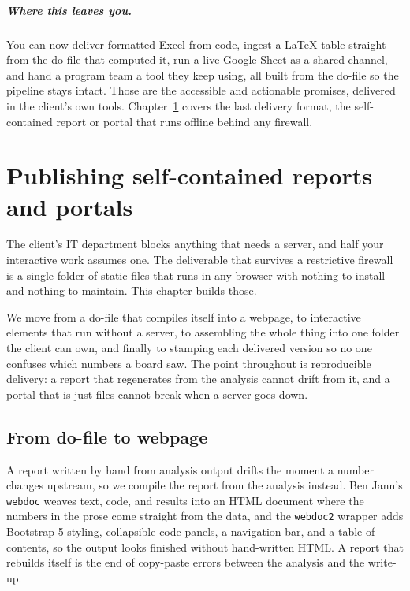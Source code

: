 \documentclass[
    a4paper,
    fontsize=10pt,
    twoside=true,
    numbers=noenddot,
]{kaobook}
\begin{document}
\paragraph{Where this leaves you.} You can now deliver formatted Excel from code, ingest a \LaTeX{} table straight from the do-file that computed it, run a live Google Sheet as a shared channel, and hand a program team a tool they keep using, all built from the do-file so the pipeline stays intact. Those are the accessible and actionable promises, delivered in the client's own tools. Chapter~\ref{ch:portals} covers the last delivery format, the self-contained report or portal that runs offline behind any firewall.
\chapter{Publishing self-contained reports and portals}\label{ch:portals}

The client's IT department blocks anything that needs a server, and half your interactive work assumes one. The deliverable that survives a restrictive firewall is a single folder of static files that runs in any browser with nothing to install and nothing to maintain. This chapter builds those.

We move from a do-file that compiles itself into a webpage, to interactive elements that run without a server, to assembling the whole thing into one folder the client can own, and finally to stamping each delivered version so no one confuses which numbers a board saw. The point throughout is reproducible delivery: a report that regenerates from the analysis cannot drift from it, and a portal that is just files cannot break when a server goes down.

\section{From do-file to webpage}
A report written by hand from analysis output drifts the moment a number changes upstream, so we compile the report from the analysis instead. Ben Jann's \texttt{webdoc} weaves text, code, and results into an HTML document where the numbers in the prose come straight from the data, and the \texttt{webdoc2} wrapper adds Bootstrap-5 styling, collapsible code panels, a navigation bar, and a table of contents, so the output looks finished without hand-written HTML. A report that rebuilds itself is the end of copy-paste errors between the analysis and the write-up.
\end{document}
